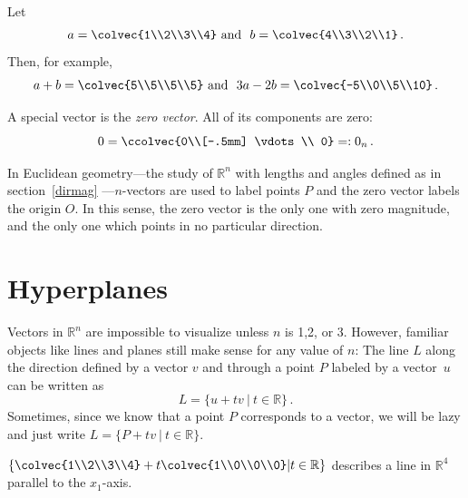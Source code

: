 \begin{example}
Let 
\[a=\colvec{1\\2\\3\\4} \mbox{ and }\ b = \colvec{4\\3\\2\\1}\, .\]
Then, for example,
\[a+b= \colvec{5\\5\\5\\5} \mbox{ and }\  3a - 2b= \colvec{-5\\0\\5\\10}\, .\]
\end{example}



A special vector is the \emph{zero vector}. 
All of its components are zero:
\[
0=\ccolvec{0\\[-.5mm] \vdots \\ 0}=:0_n\, .
\]

In Euclidean geometry---the study of ${\mathbb R}^n$ with lengths and angles defined as in section~\ref{dirmag}
---$n$-vectors are used to label points  $P$ and the zero vector labels the origin $O$. In this sense,
  the zero vector is the only one  with zero magnitude, and the only one which points in no particular direction.  

\section{Hyperplanes}
Vectors in ${\mathbb R}^n$ are impossible to visualize unless $n$ is 1,2, or 3. However, familiar objects like lines and planes still make sense for any value of $n$:
The line $L$ along the direction defined by a vector $v$ and through a point $P$ labeled by a vector~$u$  can be written as 
\[L=\{ u + tv ~|~ t \in \mathbb{R} \}\, .\]  
Sometimes, since we know that a point $P$ corresponds to a vector,  we will be lazy and just write $L=\{P + tv ~|~ t \in \mathbb{R} \}$.  

\begin{example} %
$\left\{ \colvec{1\\2\\3\\4} + t\colvec{1\\0\\0\\0} \middle\arrowvert t \in \mathbb{R} \right\}$ describes a line in ${\mathbb{R}}^4$ parallel to the $x_1$-axis.
\end{example}



